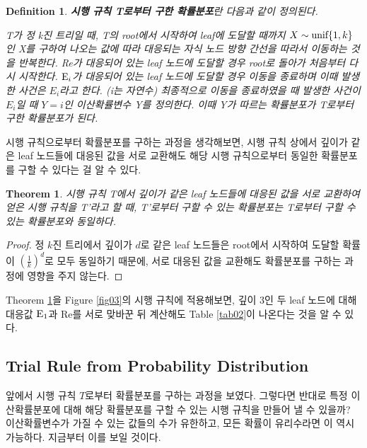 \documentclass[11pt]{article}
\newtheorem*{definition}{Definition}
\newtheorem{theorem}{Theorem}
\begin{document}
\begin{definition}
\textbf{시행 규칙 T로부터 구한 확률분포}란 다음과 같이 정의된다.

T가 정 k진 트리일 때, T의 root에서 시작하여 leaf에 도달할 때까지 $X \sim \textnormal{unif}\{1, k\}$인 X를 구하여 나오는 값에 따라 대응되는 자식 노드 방향 간선을 따라서 이동하는 것을 반복한다. \textnormal{Re}가 대응되어 있는 leaf 노드에 도달할 경우 root로 돌아가 처음부터 다시 시작한다. $\textnormal{E}_i$가 대응되어 있는 leaf 노드에 도달할 경우 이동을 종료하며 이때 발생한 사건은 $E_{i}$라고 한다. (i는 자연수) 최종적으로 이동을 종료하였을 때 발생한 사건이 $E_{i}$일 때 $Y = i$인 이산확률변수 Y를 정의한다. 이때 Y가 따르는 확률분포가 T로부터 구한 확률분포가 된다.
\end{definition}

시행 규칙으로부터 확률분포를 구하는 과정을 생각해보면, 시행 규칙 상에서 깊이가 같은 leaf 노드들에 대응된 값을 서로 교환해도 해당 시행 규칙으로부터 동일한 확률분포를 구할 수 있다는 걸 알 수 있다.

\singlespacing
\begin{theorem}
시행 규칙 T에서 깊이가 같은 leaf 노드들에 대응된 값을 서로 교환하여 얻은 시행 규칙을 T'라고 할 때, T'로부터 구할 수 있는 확률분포는 T로부터 구할 수 있는 확률분포와 동일하다.
\label{thm01}
\end{theorem}
\doublespacing

\begin{proof}
정 $k$진 트리에서 깊이가 $d$로 같은 leaf 노드들은 root에서 시작하여 도달할 확률이 $\displaystyle \left(\frac{1}{k}\right)^{d}$로 모두 동일하기 때문에, 서로 대응된 값을 교환해도 확률분포를 구하는 과정에 영향을 주지 않는다.
\end{proof}

Theorem \ref{thm01}을 Figure \ref{fig03}의 시행 규칙에 적용해보면, 깊이 3인 두 leaf 노드에 대해 대응값 $\textnormal{E}_{1}$과 Re를 서로 맞바꾼 뒤 계산해도 Table \ref{tab02}이 나온다는 것을 알 수 있다.

\subsection{Trial Rule from Probability Distribution} \label{subsection3-2}
앞에서 시행 규칙 $T$로부터 확률분포를 구하는 과정을 보였다. 그렇다면 반대로 특정 이산확률분포에 대해 해당 확률분포를 구할 수 있는 시행 규칙을 만들어 낼 수 있을까? 이산확률변수가 가질 수 있는 값들의 수가 유한하고, 모든 확률이 유리수라면 이 역시 가능하다. 지금부터 이를 보일 것이다. 
\end{document}
